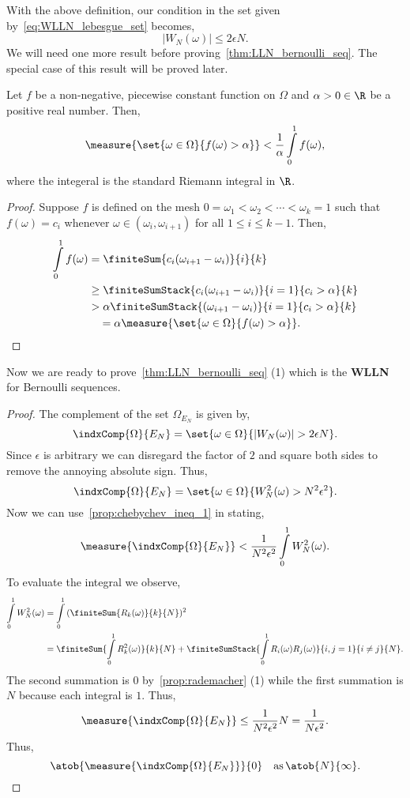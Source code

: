 With the above definition, our condition in the set given by~\ref{eq:WLLN_lebesgue_set} becomes,
\[\lvert W_N(\omega) \rvert \leq 2\epsilon N.\]
We will need one more result before proving~\ref{thm:LLN_bernoulli_seq}. The special case of this
result will be proved later.
\begin{Proposition}\label{prop:chebychev_ineq_1}
    Let $f$ be a non-negative, piecewise constant function on $\Omega$ and $\alpha > 0 \in \R$ be a
    positive real number. Then,
    \[\measure{\set{\omega\in\Omega}{f(\omega) > \alpha}} <
	\frac{1}{\alpha}\int\limits_{0}^{1}f(\omega),\]
    where the integeral is the standard Riemann integral in $\R$.
\end{Proposition}
\begin{proof}
    Suppose $f$ is defined on the mesh $0 = \omega_{1} < \omega_{2} < \cdots < \omega_{k} = 1$ 
    such that $f(\omega) = c_i$
    whenever $\omega \in (\omega_{i},\omega_{i+1})$ for all $1 \leq i \leq k-1$.
    Then,
    \begin{align*}
	\int\limits_{0}^{1}f(\omega) &= \finiteSum{c_i({\omega}_{i+1} - {\omega}_i)}{i}{k} \\
	& \geq \finiteSumStack{c_i({\omega}_{i+1} - {\omega}_i)}{i=1}{c_i > \alpha}{k} \\
	& > \alpha \finiteSumStack{({\omega}_{i+1} - {\omega}_i)}{i=1}{c_i > \alpha}{k} \\
	& \quad = \alpha\measure{\set{\omega\in\Omega}{f(\omega) > \alpha}}.
    \end{align*}
\end{proof}
Now we are ready to prove~\ref{thm:LLN_bernoulli_seq} (1) which is the \textbf{WLLN} for Bernoulli
sequences.
\begin{proof}
    The complement of the set $\Omega_{E_N}$ is given by,
    \[\indxComp{\Omega}{E_N} = \set{\omega\in\Omega}{\lvert W_N(\omega) \rvert > 2\epsilon
	    N}.\]
    Since $\epsilon$ is arbitrary we can disregard the factor of $2$ and square both sides to
    remove the annoying absolute sign. Thus,
    \[\indxComp{\Omega}{E_N} = \set{\omega\in\Omega}{W^{2}_{N}(\omega)  >
	    N^2{\epsilon}^2}.\]
    Now we can use~\ref{prop:chebychev_ineq_1} in stating,
    \[\measure{\indxComp{\Omega}{E_N}} < 
	\frac{1}{N^2{\epsilon}^2}\int\limits_{0}^{1}W^2_N(\omega).\]
    To evaluate the integral we observe,
    \begin{align*}
	\int\limits_{0}^{1}W^2_N(\omega) &= \int\limits_{0}^{1}{(\finiteSum{R_k(\omega)}{k}{N})^2}\\
	&= \finiteSum{\int\limits_{0}^{1}R_k^2(\omega)}{k}{N} + 
	\finiteSumStack{\int\limits_{0}^{1}R_i(\omega)R_j(\omega)}{i,j=1}{i\neq j}{N}.
    \end{align*}
    The second summation is $0$ by~\ref{prop:rademacher} (1) while the first summation is $N$
    because each integral is $1$.
    Thus,
    \[\measure{\indxComp{\Omega}{E_N}} \leq \frac{1}{N^2{\epsilon}^2}N =
	\frac{1}{N{\epsilon}^2}.\]
    Thus,
    \[\atob{\measure{\indxComp{\Omega}{E_N}}}{0}\quad\text{as}\,\atob{N}{\infty}.\]

\end{proof}

